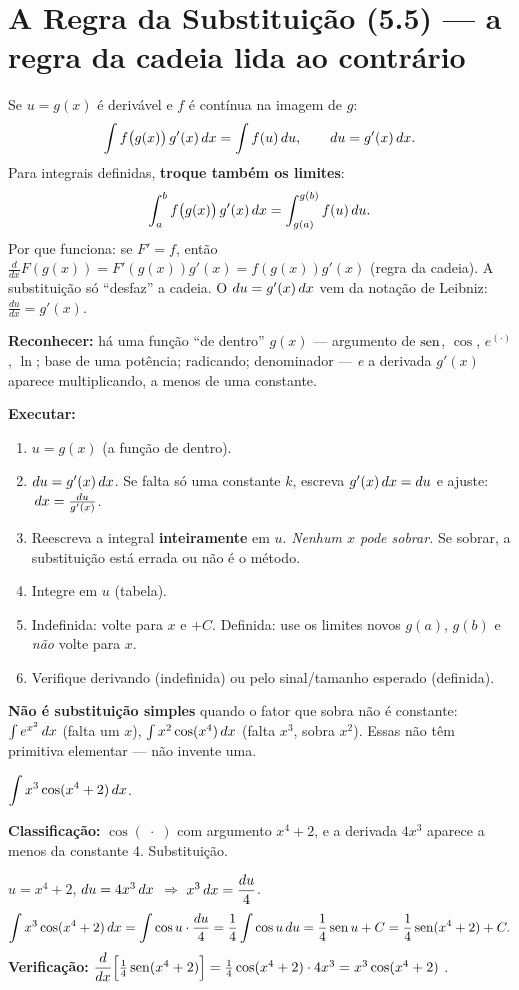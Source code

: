 \section[Regra da Substituição (5.5)]{A Regra da Substituição (5.5) --- a regra da cadeia lida ao contrário}

\begin{definicao}
Se $u=g(x)$ é derivável e $f$ é contínua na imagem de $g$:
\[
\int f\big(g(x)\big)\,g'(x)\,dx=\int f(u)\,du,\qquad du=g'(x)\,dx .
\]
Para integrais definidas, \textbf{troque também os limites}:
\[
\int_a^b f\big(g(x)\big)\,g'(x)\,dx=\int_{g(a)}^{g(b)}f(u)\,du .
\]
Por que funciona: se $F'=f$, então $\frac{d}{dx}F(g(x))=F'(g(x))g'(x)=f(g(x))g'(x)$ (regra da cadeia). A substituição só ``desfaz'' a cadeia. O $du=g'(x)\,dx$ vem da notação de Leibniz: $\frac{du}{dx}=g'(x)$.
\end{definicao}

\begin{metodo}
\textbf{Reconhecer:} há uma função ``de dentro'' $g(x)$ --- argumento de $\operatorname{sen}$, $\cos$, $e^{(\cdot)}$, $\ln$; base de uma potência; radicando; denominador --- \emph{e} a derivada $g'(x)$ aparece multiplicando, a menos de uma constante.

\textbf{Executar:}
\begin{enumerate}[leftmargin=1.6em, itemsep=1pt]
\item $u=g(x)$ (a função de dentro).
\item $du=g'(x)\,dx$. Se falta só uma constante $k$, escreva $g'(x)\,dx=du$ e ajuste: $\,dx=\frac{du}{g'(x)}$.
\item Reescreva a integral \textbf{inteiramente} em $u$. \emph{Nenhum $x$ pode sobrar.} Se sobrar, a substituição está errada ou não é o método.
\item Integre em $u$ (tabela).
\item Indefinida: volte para $x$ e $+C$. Definida: use os limites novos $g(a)$, $g(b)$ e \emph{não} volte para $x$.
\item Verifique derivando (indefinida) ou pelo sinal/tamanho esperado (definida).
\end{enumerate}
\textbf{Não é substituição simples} quando o fator que sobra não é constante: $\int e^{x^2}\,dx$ (falta um $x$), $\int x^2\cos(x^4)\,dx$ (falta $x^3$, sobra $x^2$). Essas não têm primitiva elementar --- não invente uma.
\end{metodo}

\begin{exemplo}
$\displaystyle\int x^3\cos(x^4+2)\,dx$.

\textbf{Classificação:} $\cos(\;\cdot\;)$ com argumento $x^4+2$, e a derivada $4x^3$ aparece a menos da constante $4$. Substituição.

$u=x^4+2$, \; $du=4x^3\,dx$ \;$\Rightarrow$\; $x^3\,dx=\dfrac{du}{4}$.
\[
\int x^3\cos(x^4+2)\,dx=\int\cos u\cdot\frac{du}{4}=\frac14\int\cos u\,du=\frac14\operatorname{sen} u+C=\frac14\operatorname{sen}(x^4+2)+C .
\]
\textbf{Verificação:} $\dfrac{d}{dx}\Big[\tfrac14\operatorname{sen}(x^4+2)\Big]=\tfrac14\cos(x^4+2)\cdot4x^3=x^3\cos(x^4+2)$ \ok.
\end{exemplo}

